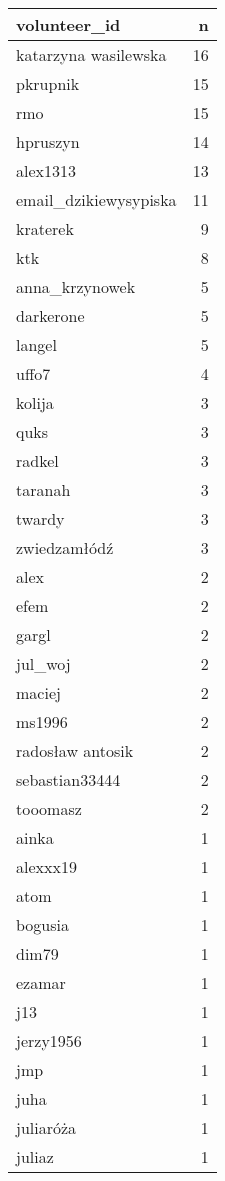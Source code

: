 \documentclass[
]{article}
\begin{document}
\begin{table}
\centering
\begin{tabular}[t]{l|r}
\hline
volunteer\_id & n\\
\hline
katarzyna wasilewska & 16\\
\hline
pkrupnik & 15\\
\hline
rmo & 15\\
\hline
hpruszyn & 14\\
\hline
alex1313 & 13\\
\hline
email\_dzikiewysypiska & 11\\
\hline
kraterek & 9\\
\hline
ktk & 8\\
\hline
anna\_krzynowek & 5\\
\hline
darkerone & 5\\
\hline
langel & 5\\
\hline
uffo7 & 4\\
\hline
kolija & 3\\
\hline
quks & 3\\
\hline
radkel & 3\\
\hline
taranah & 3\\
\hline
twardy & 3\\
\hline
zwiedzamłódź & 3\\
\hline
alex & 2\\
\hline
efem & 2\\
\hline
gargl & 2\\
\hline
jul\_woj & 2\\
\hline
maciej & 2\\
\hline
ms1996 & 2\\
\hline
radosław antosik & 2\\
\hline
sebastian33444 & 2\\
\hline
tooomasz & 2\\
\hline
ainka & 1\\
\hline
alexxx19 & 1\\
\hline
atom & 1\\
\hline
bogusia & 1\\
\hline
dim79 & 1\\
\hline
ezamar & 1\\
\hline
j13 & 1\\
\hline
jerzy1956 & 1\\
\hline
jmp & 1\\
\hline
juha & 1\\
\hline
juliaróża & 1\\
\hline
juliaz & 1\\

\end{tabular}
\end{table}
\end{document}
